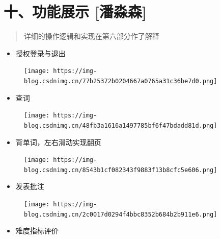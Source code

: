 \documentclass[
]{article}
\begin{document}
\hypertarget{ux5341ux529fux80fdux5c55ux793a-ux6f58ux6dfcux68ee}{%
\section{十、功能展示
{[}潘淼森{]}}\label{ux5341ux529fux80fdux5c55ux793a-ux6f58ux6dfcux68ee}}

\begin{quote}
详细的操作逻辑和实现在第六部分作了解释
\end{quote}

\begin{itemize}
\item
  授权登录与退出
\end{itemize}

\begin{figure}
\centering
\texttt{[image: https://img-blog.csdnimg.cn/77b25372b0204667a0765a31c36be7d0.png]}
\caption{}
\end{figure}

\begin{itemize}
\item
  查词
\end{itemize}

\begin{figure}
\centering
\texttt{[image: https://img-blog.csdnimg.cn/48fb3a1616a1497785bf6f47bdadd81d.png]}
\caption{}
\end{figure}

\begin{itemize}
\item
  背单词，左右滑动实现翻页
\end{itemize}

\begin{figure}
\centering
\texttt{[image: https://img-blog.csdnimg.cn/8543b1cf082343f9883f13b8cfc5e606.png]}
\caption{}
\end{figure}

\begin{itemize}
\item
  发表批注
\end{itemize}

\begin{figure}
\centering
\texttt{[image: https://img-blog.csdnimg.cn/2c0017d0294f4bbc8352b684b2b911e6.png]}
\caption{}
\end{figure}

\begin{itemize}
\item
  难度指标评价
\end{itemize}
\end{document}
